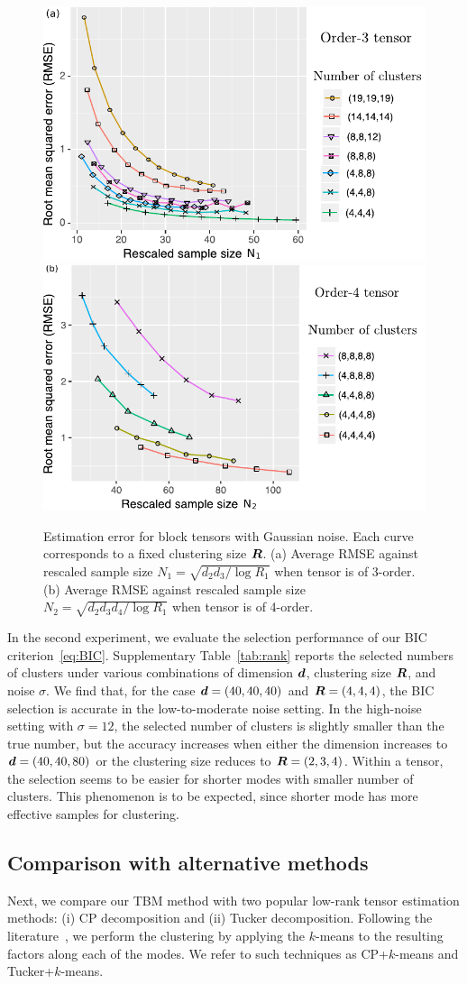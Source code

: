 \documentclass{article}
\begin{document}
\begin{figure}[h!]
\vspace{-.1cm}
\centering
\includegraphics[width=.4\textwidth]{figures/figure.pdf}
\includegraphics[width=.4\textwidth]{figures/rescale_order4.pdf}
\caption{\small Estimation error for block tensors with Gaussian noise. Each curve corresponds to a fixed clustering size $\bm{R}$. (a) Average RMSE against rescaled sample size $N_1=\sqrt{d_2d_3/\log R_1}$ when tensor is of 3-order. (b) Average RMSE against rescaled sample size $N_2=\sqrt{d_2d_3d_4/\log R_1}$ when tensor is of 4-order. 
}\label{fig:RMSE}
\vspace{-.2cm}
\end{figure}

In the second experiment, we evaluate the selection performance of our BIC criterion~\eqref{eq:BIC}. Supplementary Table~\ref{tab:rank} reports the selected numbers of clusters under various combinations of dimension $\bm{d}$, clustering size $\bm{R}$, and noise $\sigma$. We find that, for the case $\bm{d}=(40,40,40)$ and $\bm{R}=(4,4,4)$, the BIC selection is accurate in the low-to-moderate noise setting. In the high-noise setting with $\sigma=12$, the selected number of clusters is slightly smaller than the true number, but the accuracy increases when either the dimension increases to $\bm{d}=(40,40,80)$ or the clustering size reduces to $\bm{R}=(2,3,4)$. Within a tensor, the selection seems to be easier for shorter modes with smaller number of clusters. This phenomenon is to be expected, since shorter mode has more effective samples for clustering. 


\subsection{Comparison with alternative methods}
\vspace{-.2cm}
Next, we compare our TBM method with two popular low-rank tensor estimation methods: (i) CP decomposition and (ii) Tucker decomposition. Following the literature~\cite{chi2018provable,hore2016tensor,kolda2008scalable}, we perform the clustering by applying the $k$-means to the resulting factors along each of the modes. We refer to such techniques as CP+$k$-means and Tucker+$k$-means. 
\end{document}
